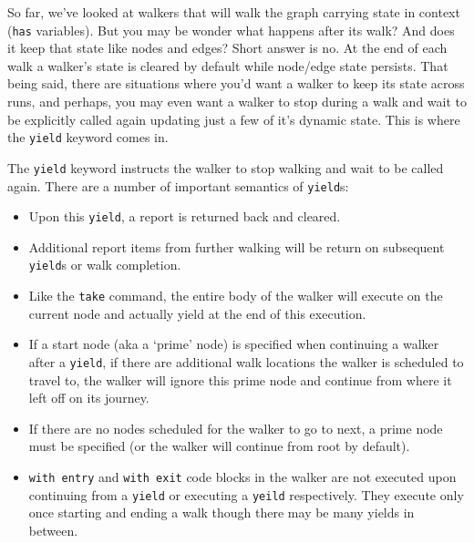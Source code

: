 So far, we've looked at walkers that will walk the graph carrying state in context (\lstinline{has} variables).
But you may be wonder what happens after its walk? And does it keep that state like nodes and edges? Short answer is no.
At the end of each walk a walker's state is cleared by default while node/edge state persists.
That being said, there are situations where you'd want a walker to keep its state across runs, and perhaps, you may even want a walker to stop during a walk and wait to be explicitly called again updating just a few of it's dynamic state.
This is where the \lstinline{yield} keyword comes in.
\par
The \lstinline{yield} keyword instructs the walker to stop walking and wait to be called again.
There are a number of important semantics of \lstinline{yield}s:
\begin{itemize}
    \item Upon this \lstinline{yield}, a report is returned back and cleared.
    \item Additional report items from further walking will be return on subsequent \lstinline{yield}s or walk completion.
    \item Like the \lstinline{take} command, the entire body of the walker will execute on the current node and actually yield at the end of this execution.
    \item If a start node (aka a `prime' node) is specified when continuing a walker after a \lstinline{yield}, if there are additional walk locations the walker is scheduled to travel to, the walker will ignore this prime node and continue from where it left off on its journey.
    \item If there are no nodes scheduled for the walker to go to next, a prime node must be specified (or the walker will continue from root by default).
    \item \lstinline{with entry} and \lstinline{with exit} code blocks in the walker are not executed upon continuing from a \lstinline{yield} or executing a \lstinline{yeild} respectively. They execute only once starting and ending a walk though there may be many yields in between.
\end{itemize}


